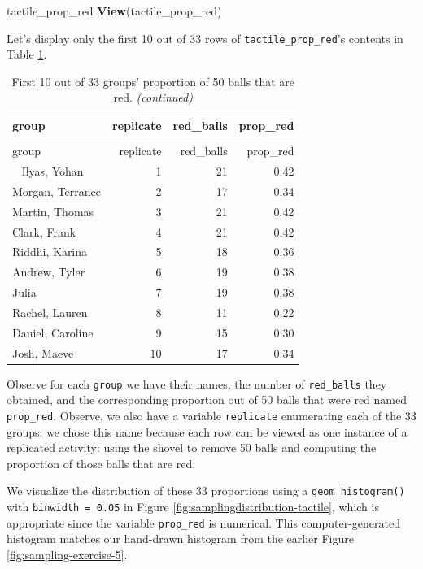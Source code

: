 \documentclass[12pt, krantz2,]{krantz}
\makeatletter
\newenvironment{Shaded}{\begin{snugshade}}{\end{snugshade}}
\newcommand{\KeywordTok}[1]{\textcolor[rgb]{0.27,0.27,0.27}{\textbf{#1}}}
\newcommand{\NormalTok}[1]{#1}
\newenvironment{kframe}{%
\medskip{}
\setlength{\fboxsep}{.8em}
 \def\at@end@of@kframe{}%
 \ifinner\ifhmode%
  \def\at@end@of@kframe{\end{minipage}}%
  \begin{minipage}{\columnwidth}%
 \fi\fi%
 \def\FrameCommand##1{\hskip\@totalleftmargin \hskip-\fboxsep
 \colorbox{shadecolor}{##1}\hskip-\fboxsep
     \hskip-\linewidth \hskip-\@totalleftmargin \hskip\columnwidth}%
 \MakeFramed {\advance\hsize-\width
   \@totalleftmargin\z@ \linewidth\hsize
   \@setminipage}}%
 {\par\unskip\endMakeFramed%
 \at@end@of@kframe}
\renewenvironment{Shaded}{\begin{kframe}}{\end{kframe}}
\makeatother
\begin{document}
\begin{Shaded}
\begin{Highlighting}[]
\NormalTok{tactile_prop_red}
\KeywordTok{View}\NormalTok{(tactile_prop_red)}
\end{Highlighting}
\end{Shaded}

Let's display only the first 10 out of 33 rows of \texttt{tactile\_prop\_red}'s contents in Table \ref{tab:tactilered}.

\begingroup\fontsize{10}{12}\selectfont

\begin{longtable}{lrrr}
\caption{\label{tab:tactilered}First 10 out of 33 groups' proportion of 50 balls that are red.}\\
\toprule
group & replicate & red\_balls & prop\_red\\
\midrule
\endfirsthead
\caption[]{\label{tab:tactilered}First 10 out of 33 groups' proportion of 50 balls that are red. \textit{(continued)}}\\
\toprule
group & replicate & red\_balls & prop\_red\\
\midrule
\endhead
\
\endfoot
\bottomrule
\endlastfoot
Ilyas, Yohan & 1 & 21 & 0.42\\
Morgan, Terrance & 2 & 17 & 0.34\\
Martin, Thomas & 3 & 21 & 0.42\\
Clark, Frank & 4 & 21 & 0.42\\
Riddhi, Karina & 5 & 18 & 0.36\\
\addlinespace
Andrew, Tyler & 6 & 19 & 0.38\\
Julia & 7 & 19 & 0.38\\
Rachel, Lauren & 8 & 11 & 0.22\\
Daniel, Caroline & 9 & 15 & 0.30\\
Josh, Maeve & 10 & 17 & 0.34\\*
\end{longtable}
\endgroup{}

Observe for each \texttt{group} we have their names, the number of \texttt{red\_balls} they obtained, and the corresponding proportion out of 50 balls that were red named \texttt{prop\_red}. Observe, we also have a variable \texttt{replicate} enumerating each of the 33 groups; we chose this name because each row can be viewed as one instance of a replicated activity: using the shovel to remove 50 balls and computing the proportion of those balls that are red.

We visualize the distribution of these 33 proportions using a \texttt{geom\_histogram()} with \texttt{binwidth\ =\ 0.05} in Figure \ref{fig:samplingdistribution-tactile}, which is appropriate since the variable \texttt{prop\_red} is numerical. This computer-generated histogram matches our hand-drawn histogram from the earlier Figure \ref{fig:sampling-exercise-5}.
\end{document}
